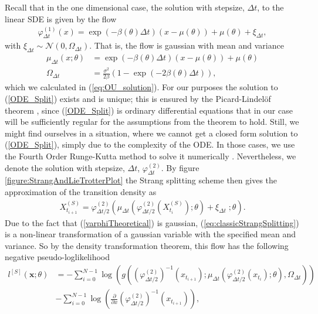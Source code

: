 Recall that in the one dimensional case, the solution with stepsize, $\Delta t$, to the linear SDE is given by the flow
\begin{align}
    \varphi_{\Delta t}^{(1)}(x) = \exp\left(-\beta\left(\theta\right) \Delta t\right)\left(x - \mu\left(\theta\right)\right) + \mu\left(\theta\right) + \xi_{\Delta t}, \label{varphiTheoretical}
\end{align}
with $\xi_{\Delta t}\sim\mathcal{N}\left(0, \Omega_{\Delta t}\right)$. That is, the flow is gaussian with mean and variance
\begin{align}
    \mu_{\Delta t}(x; \theta) &= \exp\left(-\beta\left(\theta\right) \Delta t\right)\left(x - \mu\left(\theta\right)\right) + \mu\left(\theta\right) \label{linearSDEMean}\\
    \Omega_{\Delta t} &= \frac{\sigma^2}{2\beta}\left(1 - \exp\left(-2\beta\left(\theta\right)\Delta t\right)\right), \label{linearSDEVariance}
\end{align}
which we calculated in (\ref{eq:OU_solution}). For our purposes the solution to (\ref{ODE_Split}) exists and is unique; this is ensured by the Picard-Lindelöf theorem \cite[section 2.7]{Srkk2019}, since (\ref{ODE_Split}) is ordinary differential equations that in our case will be sufficiently regular for the assumptions from the theorem to hold. Still, we might find ourselves in a situation, where we cannot get a closed form solution to (\ref{ODE_Split}), simply due to the complexity of the ODE. In those cases, we use the Fourth Order Runge-Kutta method to solve it numerically \cite[p.541 equation (8)]{numericalAnalysis}.  
Nevertheless, we denote the solution with stepsize, $\Delta t$, $\varphi_{\Delta t}^{(2)}$. By figure \ref{figure:StrangAndLieTrotterPlot} the Strang splitting scheme then gives the approximation of the transition density as 
\begin{align}
    X_{t_{i+1}}^{(S)} = \varphi_{\Delta t / 2}^{(2)}\left(\mu_{\Delta t}\left(\varphi_{\Delta t/2}^{(2)}\left(X_{t_{i}}^{(S)}\right); \theta\right) + \xi_{\Delta t} \; ; \theta \right). \label{eq:classicStrangSplitting}
\end{align}
Due to the fact that (\ref{varphiTheoretical}) is gaussian, (\ref{eq:classicStrangSplitting}) is a non-linear transformation of a gaussian variable with the specified mean and variance. So by the density transformation theorem, this flow has the following negative pseudo-loglikelihood 
\begin{align}
    l^{[S]}(\mathbf{x}; \theta) &= -\sum_{i = 0}^{N - 1}\log\left(g\left(\left(\varphi_{\Delta t / 2}^{(2)}\right)^{-1}\left(x_{t_{i+1}}\right); \mu_{\Delta t}\left(\varphi_{\Delta t/2}^{(2)}\left(x_{t_{i}}\right); \theta \right), \Omega_{\Delta t} \right) \right) \nonumber \\
    &- \sum_{i = 0}^{N - 1}\log\left(\frac{\partial}{\partial x}\left(\varphi_{\Delta t / 2}^{(2)}\right)^{-1}\left(x_{t_{i + 1}}\right) \right), \label{eq:Strang_likelihood}
\end{align}
